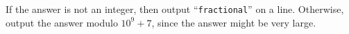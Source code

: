 If the answer is not an integer, then output ``\verb+fractional+'' on a line.
Otherwise, output the answer modulo $10^9+7$, since the answer might be very
large.
